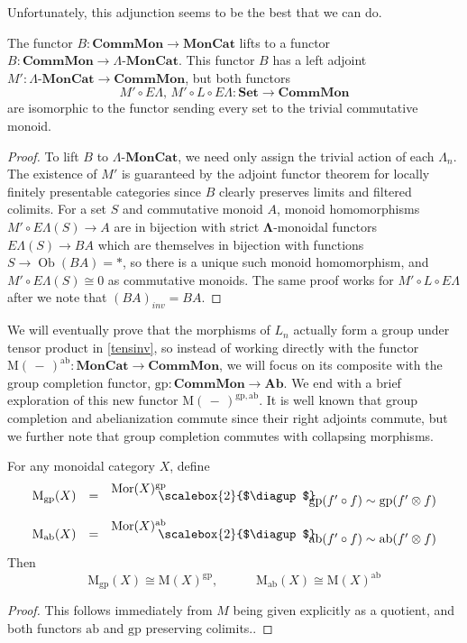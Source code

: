 \documentclass{amsbook} %
\newcommand{\mb}{\mathbf}
\newcommand{\Set}{\mb{Set}}
\newcommand{\ML}{\mathbf{\Lambda}}
\newcommand{\bigquotient}[2]{ \raisebox{0.75\height}{$#1$} \mkern-12mu\scalebox{2}{$\diagup$}\mkern-10mu \raisebox{-0.5\height}{$#2$} }
\newcommand{\EL}{E\Lambda}
\newcommand{\ob}{\operatorname{Ob}}
\newcommand{\lmc}{\Lambda\mbox{-}\mb{MonCat}}
\newcommand{\sets}{\Set}
\newcommand{\cmon}{\ensuremath{\mb{CommMon}}}
\newcommand{\moncat}{\ensuremath{\mb{MonCat}}}
\numberwithin{section}{chapter}
\begin{document}
Unfortunately, this adjunction seems to be the best that we can do. 
\begin{prop}
The functor $B \colon \cmon \to \moncat$ lifts to a functor $B \colon \cmon \to \lmc$. This functor $B$ has a left adjoint $M' \colon \lmc \to \cmon$, but both functors
\[
M' \circ \EL, \, M' \circ L \circ \EL \colon \sets \to \cmon
\]
are isomorphic to the functor sending every set to the trivial commutative monoid.
\end{prop}
\begin{proof}
To lift $B$ to $\lmc$, we need only assign the trivial action of each $\Lambda_n$. The existence of $M'$ is guaranteed by the adjoint functor theorem for locally finitely presentable categories since $B$ clearly preserves limits and filtered colimits.  For a set $S$ and commutative monoid $A$, monoid homomorphisms $M' \circ \EL(S) \to A$ are in bijection with strict $\ML$-monoidal functors $\EL(S) \to BA$ which are themselves in bijection with functions $S \to \ob(BA) = *$, so there is a unique such monoid homomorphism, and $M' \circ \EL(S) \cong 0$ as commutative monoids. The same proof works for $M' \circ L \circ \EL$ after we note that $(BA)_{inv} = BA$.
\end{proof}





 We will eventually prove that the morphisms of $L_n$ actually form a group under tensor product in \cref{tensinv}, so instead of working directly with the functor $\mathrm{M}(\, - \,)^{\mathrm{ab}} \colon  \moncat \to \cmon$, we will focus on its composite with the group completion functor, $\mathrm{gp} \colon \cmon \to \mb{Ab}$. We end with a brief exploration of this new functor $\mathrm{M}(\, - \,)^{\mathrm{gp},\mathrm{ab}}$.  
It is well known that group completion and abelianization commute since their right adjoints commute, but we further note that group completion commutes with collapsing morphisms.


\begin{lem}\label{Morder} For any monoidal category $X$, define
\[ \begin{array}{rll} 
			\mathrm{M}_{\mathrm{gp}}(X) & = & \bigquotient{\mathrm{Mor}(X)^{\mathrm{gp}}}{\mathrm{gp}(f' \circ f) \sim \mathrm{gp}(f' \otimes f)} \\[\bigskipamount]
			\mathrm{M}_{\mathrm{ab}}(X) & = & \bigquotient{\mathrm{Mor}(X)^{\mathrm{ab}}}{\mathrm{ab}(f' \circ f) \sim \mathrm{ab}(f' \otimes f)}
		\end{array}
\] 
Then
\[ \mathrm{M}_{\mathrm{gp}}(X) \cong \mathrm{M}(X)^{\mathrm{gp}}, \quad \quad \quad \mathrm{M}_{\mathrm{ab}}(X) \cong \mathrm{M}(X)^{\mathrm{ab}} \]
\end{lem}
\begin{proof}
This follows immediately from $M$ being given explicitly as a quotient, and both functors $\mathrm{ab}$ and $\mathrm{gp}$ preserving colimits..
\end{proof}
\end{document}
